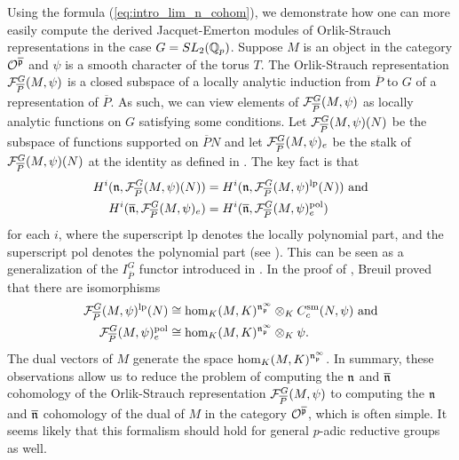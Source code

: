 \documentclass[10pt]{amsart}
\begin{document}
Using the formula (\ref{eq:intro_lim_n_cohom}), we demonstrate how one can more easily compute the derived Jacquet-Emerton modules of Orlik-Strauch representations in the case $G=SL_{2}(\mathbb{Q}_{p})$. Suppose $M$ is an object in the category $\mathcal{O}^{\overline{\mathfrak{p}}}$ and $\psi$ is a smooth character of the torus $T$. The Orlik-Strauch representation $\mathcal{F}_{\overline{P}}^{G}(M,\psi)$ is a closed subspace of a locally analytic induction from $\overline{P}$ to $G$ of a representation of $\overline{P}$. As such, we can view elements of $\mathcal{F}_{\overline{P}}^{G}(M,\psi)$ as locally analytic functions on $G$ satisfying some conditions. Let $\mathcal{F}_{\overline{P}}^{G}(M,\psi)(N)$ be the subspace of functions supported on $\overline{P}N$ and let $\mathcal{F}_{\overline{P}}^{G}(M,\psi)_{e}$ be the stalk of $\mathcal{F}_{\overline{P}}^{G}(M,\psi)(N)$ at the identity as defined in \cite{Jacquet2}. The key fact is that \begin{align*}
    H^{i}(\mathfrak{n},\mathcal{F}_{\overline{P}}^{G}(M,\psi)(N)) &= H^{i}(\mathfrak{n},\mathcal{F}_{\overline{P}}^{G}(M,\psi)^{\text{lp}}(N)) \text{ and}\\
    H^{i}(\overline{\mathfrak{n}},\mathcal{F}_{\overline{P}}^{G}(M,\psi)_{e}) &= H^{i}(\overline{\mathfrak{n}},\mathcal{F}_{\overline{P}}^{G}(M,\psi)^{\text{pol}}_{e})
\end{align*} for each $i$, where the superscript lp denotes the locally polynomial part, and the superscript pol denotes the polynomial part (see \cite{Jacquet2}). This can be seen as a generalization of the $I_{\overline{P}}^{G}$ functor introduced in \cite{Jacquet2}. In the proof of \cite[Prop. 4.2]{Breuil_socle2}, Breuil proved that there are isomorphisms \begin{align*}
    \mathcal{F}_{\overline{P}}^{G}(M,\psi)^{\text{lp}}(N) & \cong \hom_{K}(M,K)^{\mathfrak{n}_{\mathfrak{p}}^{\infty}}\otimes_{K}C_{c}^{\text{sm}}(N,\psi) \text{ and}\\
    \mathcal{F}_{\overline{P}}^{G}(M,\psi)^{\text{pol}}_{e} & \cong \hom_{K}(M,K)^{\mathfrak{n}_{\mathfrak{p}}^{\infty}}\otimes_{K}\psi.
\end{align*} The dual vectors of $M$ generate the space $\hom_{K}(M,K)^{\mathfrak{n}_{\mathfrak{p}}^{\infty}}$. In summary, these observations allow us to reduce the problem of computing the $\mathfrak{n}$ and $\overline{\mathfrak{n}}$ cohomology of the Orlik-Strauch representation $\mathcal{F}_{\overline{P}}^{G}(M,\psi)$ to computing the $\mathfrak{n}$ and $\overline{\mathfrak{n}}$ cohomology of the dual of $M$ in the category $\mathcal{O}^{\overline{\mathfrak{p}}}$, which is often simple. It seems likely that this formalism should hold for general $p$-adic reductive groups as well.
\end{document}
